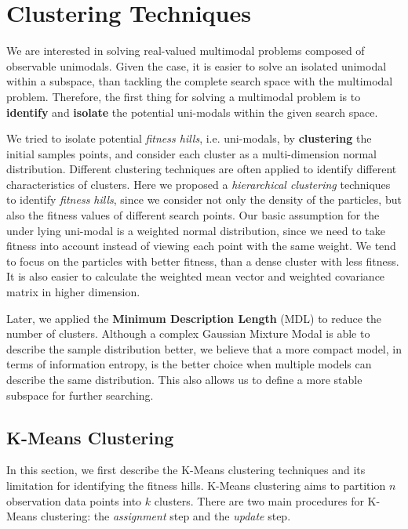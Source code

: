 \chapter{Clustering Techniques}
\label{chapter:clustering}

We are interested in solving real-valued multimodal problems composed of observable unimodals.
Given the case, it is easier to solve an isolated unimodal within a subspace,
than tackling the complete search space with the multimodal problem.
Therefore, the first thing for solving a multimodal problem is to \textbf{identify} and \textbf{isolate}
the potential uni-modals within the given search space.

We tried to isolate potential \textit{fitness hills}, i.e. uni-modals,
by \textbf{clustering} the initial samples points,
and consider each cluster as a multi-dimension normal distribution.
Different clustering techniques are often applied to identify different characteristics of clusters.
Here we proposed a \textit{hierarchical clustering} techniques to identify \textit{fitness hills},
since we consider not only the density of the particles,
but also the fitness values of different search points.
Our basic assumption for the under lying uni-modal is a weighted normal distribution, 
since we need to take fitness into account instead of viewing each point with the same weight.
We tend to focus on the particles with better fitness,
than a dense cluster with less fitness. 
It is also easier to calculate the weighted mean vector and weighted covariance matrix in higher dimension. 

Later, we applied the \textbf{Minimum Description Length} (MDL) to reduce the number of clusters.
Although a complex Gaussian Mixture Modal is able to describe the sample distribution better,
we believe that a more compact model, in terms of information entropy, is the better choice 
when multiple models can describe the same distribution. 
This also allows us to define a more stable subspace for further searching.


\section{K-Means Clustering}
In this section, we first describe the K-Means clustering techniques and its limitation for identifying the fitness hills.
K-Means clustering aims to partition $n$ observation data points into $k$ clusters.
There are two main procedures for K-Means clustering: the \textit{assignment} step and the \textit{update} step.

